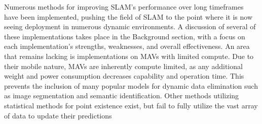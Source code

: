 Numerous methods for improving SLAM's performance over long timeframes have been implemented, pushing the field of SLAM to the point where it is now seeing deployment in numerous dynamic environments. A discussion of several of these implementations takes place in the Background section, with a focus on each implementation's strengths, weaknesses, and overall effectiveness. An area that remains lacking is implementations on MAVs with limited compute. Due to their mobile nature, MAVs are inherently compute limited, as any additional weight and power consumption decreases capability and operation time. This prevents the inclusion of many popular models for dynamic data elimination such as image segmentation and semantic identification. Other methods utilizing statistical methods for point existence exist, but fail to fully utilize the vast array of data to update their predictions